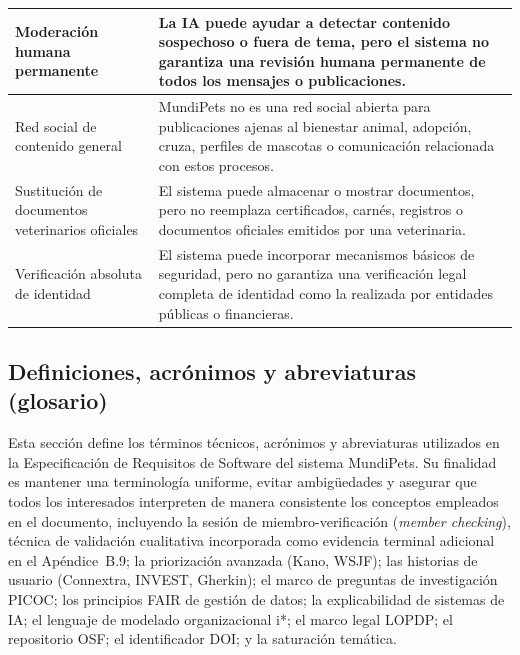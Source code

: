 \documentclass[journal,onecolumn]{IEEEtran}
\begin{document}
\begin{longtable}{|p{4cm}|p{11cm}|}
		\hline
		Moderación humana permanente & La IA puede ayudar a detectar contenido sospechoso o fuera de tema, pero el sistema no garantiza una revisión humana permanente de todos los mensajes o publicaciones. \\
		\hline
		Red social de contenido general & MundiPets no es una red social abierta para publicaciones ajenas al bienestar animal, adopción, cruza, perfiles de mascotas o comunicación relacionada con estos procesos. \\
		\hline
		Sustitución de documentos veterinarios oficiales & El sistema puede almacenar o mostrar documentos, pero no reemplaza certificados, carnés, registros o documentos oficiales emitidos por una veterinaria. \\
		\hline
		Verificación absoluta de identidad & El sistema puede incorporar mecanismos básicos de seguridad, pero no garantiza una verificación legal completa de identidad como la realizada por entidades públicas o financieras. \\
		\hline
	\end{longtable}
	
	\subsection{Definiciones, acrónimos y abreviaturas (glosario)}
	\label{sec:glosario}
	
	Esta sección define los términos técnicos, acrónimos y abreviaturas utilizados
	en la Especificación de Requisitos de Software del sistema MundiPets. Su
	finalidad es mantener una terminología uniforme, evitar ambigüedades y
	asegurar que todos los interesados interpreten de manera consistente los
	conceptos empleados en el documento, incluyendo la sesión de
	miembro-verificación (\emph{member checking}), técnica de validación
	cualitativa incorporada como evidencia terminal adicional en el
	Apéndice~B.9; la priorización avanzada (Kano, WSJF); las historias de
	usuario (Connextra, INVEST, Gherkin); el marco de preguntas de
	investigación PICOC; los principios FAIR de gestión de datos; la
	explicabilidad de sistemas de IA; el lenguaje de modelado organizacional
	i*; el marco legal LOPDP; el repositorio OSF; el identificador DOI; y la
	saturación temática.
	
\end{document}
